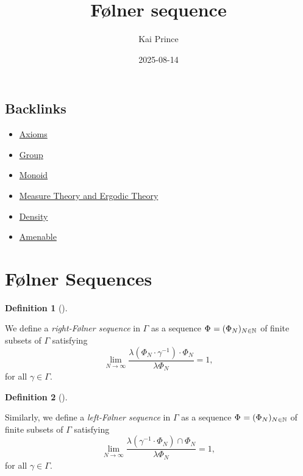 \documentclass[
  british,
]{article}
\title{Følner sequence}
\author{Kai Prince}
\date{2025-08-14}
\providecommand{\tightlist}{%
  \setlength{\itemsep}{0pt}\setlength{\parskip}{0pt}}
\renewcommand*\contentsname{Table of contents}
\newcommand\contentsname{Table of contents}
\theoremstyle{plain}
\theoremstyle{definition}
\newtheorem{definition}{Definition}[section]
\theoremstyle{remark}
\newcommand{\Folner}[1][\vphantom{}]{{\Phi}_{#1}}
\newcommand{\GroupElement}{{\gamma}}
\newcommand{\GroupOperation}[2]{{#1}\cdot{#2}}
\newcommand{\CountingMeasure}{{\lambda}}
\newcommand{\Group}{{\Gamma}}
\newcommand{\Inverse}[1]{{#1}^{-1}}
\begin{document}
\maketitle

\renewcommand*\contentsname{Table of contents}
{
\hypersetup{linkcolor=}
\setcounter{tocdepth}{3}
\tableofcontents
}

\subsection*{Backlinks}\label{sec-Backlinks}

\begin{itemize}
\tightlist
\item
  \href{../../MathsNotes/0_Fundamental/axioms.html}{Axioms}
\item
  \href{../../MathsNotes/0_Fundamental/group.html}{Group}
\item
  \href{../../MathsNotes/0_Fundamental/monoid.html}{Monoid}
\item
  \href{../../MathsNotes/2_Topological_Dynamics/measure-ergodic-theory.html}{Measure Theory and Ergodic Theory}
\item
  \href{../../MathsNotes/1_Amenable_and_Density/density.html}{Density}
\item
  \href{../../MathsNotes/1_Amenable_and_Density/amenable.html}{Amenable}
\end{itemize}

\section{Følner Sequences}\label{fuxf8lner-sequences}

\begin{definition}[]\protect\hypertarget{def-rightFolner}{}\label{def-rightFolner}

We define a \emph{right-Følner sequence} in \(\Group\) as a sequence
\(\Folner =(\Folner[N])_{N\in\mathbb{N}}\) of finite subsets of
\(\Group\) satisfying
\[\lim_{N\rightarrow\infty}\frac{\CountingMeasure{\GroupOperation{(\GroupOperation{\Folner[N]}{\Inverse{\GroupElement}})}{\Folner[N]}}}{\CountingMeasure{\Folner[N]}}=1,\]
for all \(\GroupElement\in\Group\).

\end{definition}

\begin{definition}[]\protect\hypertarget{def-leftFolner}{}\label{def-leftFolner}

Similarly, we define a \emph{left-Følner sequence} in \(\Group\) as a
sequence \(\Folner =(\Folner[N])_{N\in\mathbb{N}}\) of finite subsets of
\(\Group\) satisfying
\[\lim_{N\rightarrow\infty}\frac{\CountingMeasure{(\Inverse{\GroupElement}\cdot\Folner[N])\cap\Folner[N]}}{\CountingMeasure{\Folner[N]}}=1,\]
for all \(\GroupElement\in\Group\).

\end{definition}
\end{document}
